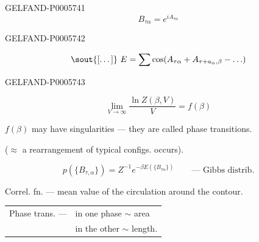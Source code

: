 \begin{GelfandAdjacentEvidence}{GELFAND-P000574}{1}
\[
B_{\tau\alpha}=e^{i A_{\tau\alpha}}
\]
\end{GelfandAdjacentEvidence}
\begin{GelfandAdjacentEvidence}{GELFAND-P000574}{2}


\[
\text{\sout{[\ldots]}}\ E=\sum\cos(A_{\tau\alpha}+A_{\tau+a_\alpha,\beta}-\ldots)
\]
\end{GelfandAdjacentEvidence}
\begin{GelfandAdjacentEvidence}{GELFAND-P000574}{3}

\end{GelfandAdjacentEvidence}

\[
\lim_{V\to\infty}\frac{\ln Z(\beta,V)}{V}=f(\beta)
\]
\hfill{}\par

\(f(\beta)\) may have singularities — they are called phase transitions.

(\(\approx\) a rearrangement of typical configs. occurs).

\[
p(\{B_{\tau,\alpha}\})=Z^{-1}e^{-\beta E(\{B_{\tau\alpha}\})}
\qquad\text{— Gibbs distrib.}
\]

Correl. fn. — mean value of the circulation around the contour.

\noindent
\begin{tabular}{@{}ll@{}}
Phase trans. — & in one phase \(\sim\) area\\
               & in the other \(\sim\) length.
\end{tabular}



